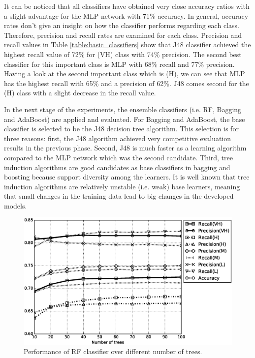\documentclass[a4paper,10pt,onecolumn,preprint,3p]{elsarticle}
\begin{document}
It can be noticed that all classifiers have obtained very close accuracy ratios with a slight advantage for the MLP network with 71\% accuracy. In general, accuracy rates don't give an insight on how the classifier performs regarding each class. Therefore, precision and recall rates are examined for each class. Precision and recall values in Table \ref{table:basic_classifiers} show that J48 classifier achieved the highest recall value of 72\% for (VH) class with 74\% precision. The second best classifier for this important class is MLP with 68\% recall and 77\% precision. Having a look at the second important class which is (H), we can see that MLP has the highest recall with 65\% and a precision of 62\%. J48 comes second for the (H) class with a slight decrease in the recall value.

In the next stage of the experiments, the ensemble classifiers (i.e. RF, Bagging and AdaBoost) are applied and evaluated. For Bagging and AdaBoost, the base classifier is selected to be the J48 decision tree algorithm. This selection is for three reasons: first, the J48 algorithm achieved very competitive evaluation results in the previous phase. Second, J48 is much faster as a learning algorithm compared to the MLP network which was the second candidate. Third, tree induction algorithms are good candidates as base classifiers in bagging and boosting because support diversity among the learners. It is well known that tree induction algorithms are relatively unstable (i.e. weak) base learners, meaning that small changes in the training data lead to big changes in the developed models. 

\begin{figure}

\centerline{\includegraphics[scale=0.46]{RF}}

\caption{Performance of RF classifier over different number of trees.}
\label{fig:PerformanceRF}
\end{figure}
\end{document}
